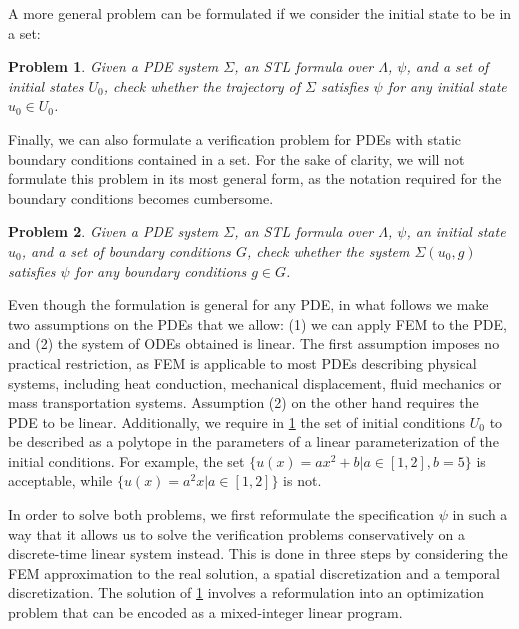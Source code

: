 \documentclass[letterpaper, 10 pt, conference]{ieeeconf/ieeeconf}
\newtheorem{problem}{Problem}
\begin{document}
A more general problem can be formulated if we consider the initial state to be
in a set:

\begin{problem}
\label{pr:stl_set}
    Given a PDE system $\Sigma$, an STL formula over $\Lambda$, $\psi$, and a set of initial states
    $U_0$, check whether the trajectory of $\Sigma$ satisfies $\psi$ 
    for any initial state $u_0 \in U_0$.
\end{problem}

Finally, we can also formulate a verification problem for PDEs with static
boundary conditions contained in a set. For the sake of clarity, we will not
formulate this problem in its most general form, as the notation required for
the boundary conditions becomes cumbersome.

\begin{problem}
\label{pr:stl_bound_set}
    Given a PDE system $\Sigma$, an STL formula over $\Lambda$, $\psi$, an
    initial state $u_0$, and a set of boundary conditions $G$, check whether the
    system $\Sigma(u_0, g)$ satisfies $\psi$ for any boundary conditions $g \in
    G$.
\end{problem}

Even though the formulation is general for any PDE, in what follows we make two
assumptions on the PDEs that we allow: (1) we can apply FEM to the PDE, and (2)
the system of ODEs obtained is linear. The first assumption imposes no practical
restriction, as FEM is applicable to most PDEs describing physical systems,
including heat conduction, mechanical displacement, fluid mechanics or
mass transportation systems. Assumption (2) on the other hand requires the PDE
to be linear. Additionally, we require in \cref{pr:stl_set} the set of initial
conditions $U_0$ to be described as a polytope in the parameters of a
linear parameterization of the initial conditions. For example, the set $\{u(x)
= a x^2 + b | a \in [1,2], b = 5\}$ is acceptable, while $\{u(x) = a^2 x |
a \in [1,2]\}$ is not.

In order to solve both problems, we first reformulate the specification $\psi$
in such a way that it allows us to solve the verification problems
conservatively on a discrete-time linear system instead. This is done in three
steps by considering the FEM approximation to the real solution, a spatial
discretization and a temporal discretization. The solution of \cref{pr:stl_set}
involves a reformulation into an optimization problem that can be encoded as a
mixed-integer linear program.
\end{document}
